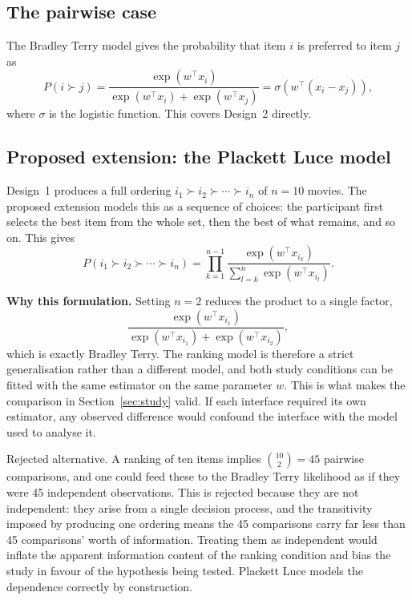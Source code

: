 \documentclass[11pt]{article}
\begin{document}
\subsection{The pairwise case}
The Bradley Terry model gives the probability that item $i$ is preferred to item $j$ as
\[
P(i \succ j) = \frac{\exp(w^\top x_i)}{\exp(w^\top x_i) + \exp(w^\top x_j)}
= \sigma\!\left(w^\top (x_i - x_j)\right),
\]
where $\sigma$ is the logistic function. This covers Design~2 directly.

\subsection{Proposed extension: the Plackett Luce model}
Design~1 produces a full ordering $i_1 \succ i_2 \succ \cdots \succ i_n$ of $n = 10$ movies. The proposed extension models this as a sequence of choices: the participant first selects the best item from the whole set, then the best of what remains, and so on. This gives
\[
P(i_1 \succ i_2 \succ \cdots \succ i_n)
= \prod_{k=1}^{n-1} \frac{\exp(w^\top x_{i_k})}{\sum_{l=k}^{n} \exp(w^\top x_{i_l})}.
\]

\textbf{Why this formulation.} Setting $n = 2$ reduces the product to a single factor,
\[
\frac{\exp(w^\top x_{i_1})}{\exp(w^\top x_{i_1}) + \exp(w^\top x_{i_2})},
\]
which is exactly Bradley Terry. The ranking model is therefore a strict generalisation rather than a different model, and both study conditions can be fitted with the same estimator on the same parameter $w$. This is what makes the comparison in Section~\ref{sec:study} valid. If each interface required its own estimator, any observed difference would confound the interface with the model used to analyse it.

Rejected alternative. A ranking of ten items implies $\binom{10}{2} = 45$ pairwise comparisons, and one could feed these to the Bradley Terry likelihood as if they were 45 independent observations. This is rejected because they are not independent: they arise from a single decision process, and the transitivity imposed by producing one ordering means the 45 comparisons carry far less than 45 comparisons' worth of information. Treating them as independent would inflate the apparent information content of the ranking condition and bias the study in favour of the hypothesis being tested. Plackett Luce models the dependence correctly by construction.
\end{document}
